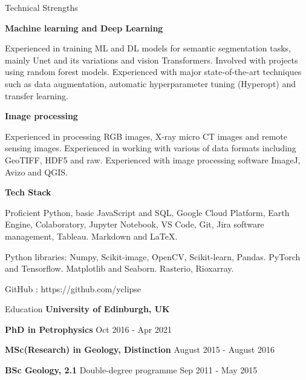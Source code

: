 \documentclass{resume} %
\newenvironment{indentpar}[1]%
  {\begin{list}{}%
          {\setlength{\leftmargin}{#1}}%
          \item[]%
  }
  {\end{list}}
\begin{document}
\begin{rSection}{Technical Strengths}

\textbf{Machine learning and Deep Learning}
    \begin{indentpar}{0.5cm}
    Experienced in training ML and DL models for semantic segmentation tasks, mainly Unet and its variations and vision Transformers. Involved with projects using random forest models. Experienced with major state-of-the-art techniques such as data augmentation, automatic hyperparameter tuning (Hyperopt) and transfer learning. 
    \end{indentpar}
    
\textbf{Image processing}
    \begin{indentpar}{0.5cm}
    Experienced in processing RGB images, X-ray micro CT images and remote sensing images. Experienced in working with various of data formats including GeoTIFF, HDF5 and raw. Experienced with image processing software ImageJ, Avizo and QGIS.
    \end{indentpar}

\textbf{Tech Stack}
    \begin{indentpar}{0.5cm}
    Proficient Python, basic JavaScript and SQL, Google Cloud Platform, Earth Engine, Colaboratory, Jupyter Notebook, VS Code, Git, Jira software management, Tableau. Markdown and \LaTeX.
    \end{indentpar}

    \begin{indentpar}{0.5cm}
    Python libraries: Numpy, Scikit-image, OpenCV, Scikit-learn, Pandas. PyTorch and Tensorflow. Matplotlib and Seaborn. Rasterio, Rioxarray.
    \end{indentpar}
    
    \begin{indentpar}{0.5cm}
    GitHub : https://github.com/yclipse
    \end{indentpar}
    
\end{rSection}

\begin{rSection}{Education}
{\bf University of Edinburgh, UK} 

\begin{indentpar}{0.5cm}
    \textbf{PhD in Petrophysics} \hfill {Oct 2016 - Apr 2021}
    
    \textbf{MSc(Research) in Geology, Distinction} \hfill {August 2015 - August 2016} 
    
    \textbf{BSc Geology, 2.1} Double-degree programme \hfill {Sep 2011 - May 2015} 
\end{indentpar}

\end{rSection}
\end{document}
